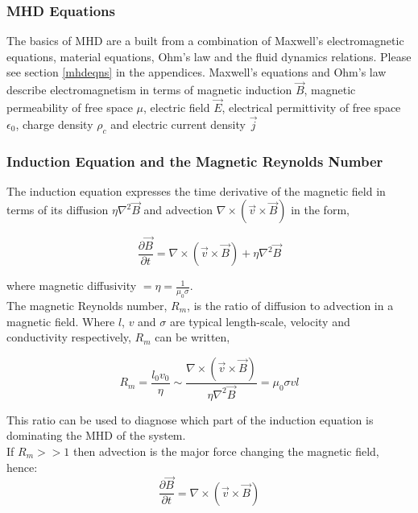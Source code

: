 \subsubsection{MHD Equations}
The basics of MHD are a built from a combination of Maxwell's electromagnetic equations, material equations, Ohm's law and the fluid dynamics relations. Please see section \ref{mhdeqns} in the appendices. Maxwell's equations and Ohm's law describe electromagnetism in terms of magnetic induction $\vec{B}$, magnetic permeability of free space $\mu$, electric field $\vec{E}$, electrical permittivity of free space $\epsilon_{0}$, charge density $\rho_{c}$ and electric current density $\vec{j}$ \\ 

 
\subsubsection{Induction Equation and the Magnetic Reynolds Number}
The induction equation expresses the time derivative of the magnetic field in terms of its diffusion $\eta\nabla^{2}\vec{B}$ and advection $\nabla\times(\vec{v}\times\vec{B})$ in the form, 


\begin{equation}\label{induction}
\frac{\partial \vec{B}}{\partial t}=\nabla\times(\vec{v}\times\vec{B})+\eta\nabla^{2}\vec{B}  
\end{equation}

where magnetic diffusivity $=\eta =\frac{1}{\mu_{0}\sigma}$. \\

The magnetic Reynolds number, $R_m$, is the ratio of diffusion to advection in a magnetic field. Where $l$, $v$ and $\sigma$ are typical length-scale, velocity and conductivity respectively, $R_m$ can be written,  

\begin{equation}\label{reynolds}
R_{m} = \frac{l_{0}v_{0}}{\eta} \sim \frac{\nabla\times(\vec{v}\times\vec{B})}{\eta\nabla^{2}\vec{B}}=\mu_{0}\sigma v l
\end{equation}

This ratio can be used to diagnose which part of the induction equation is dominating the MHD of the system. \\

If $R_m >> 1$ then advection is the major force changing the magnetic field, hence:
\begin{equation}\label{r>>1}
\frac{\partial \vec{B}}{\partial t}=\nabla\times(\vec{v}\times\vec{B})
\end{equation}
\\

